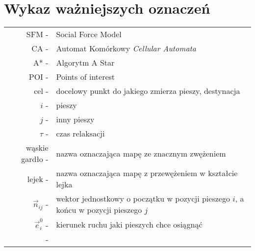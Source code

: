 \chapter{Wykaz ważniejszych oznaczeń}
\label{sec:wykazOznaczen}

\begin{center}

\begin{tabular}{rl}
SFM - & Social Force Model \\ 
CA - & Automat Komórkowy \textit{Cellular Automata} \\ 
A* - & Algorytm A Star \\ 
POI - & Points of interest \\ 
cel - & docelowy punkt do jakiego zmierza pieszy, destynacja \\ 
$i$ - & pieszy \\
$j$ - & inny pieszy \\ 
$\tau$ - & czas relaksacji \\ 
wąskie gardło - & nazwa oznaczająca mapę ze znacznym zwężeniem \\ 
lejek - & nazwa oznaczająca mapę z przewężeniem w kształcie lejka  \\ 
$\vec{n}_{ij}$ - & wektor jednostkowy o początku w pozycji pieszego $i$, a końcu w pozycji pieszego $j$ \\
$\vec{e}^{0}_{i}$ - & kierunek ruchu jaki pieszych chce osiągnąć \\
$$ - & \\ 
\end{tabular} 

\end{center}
















